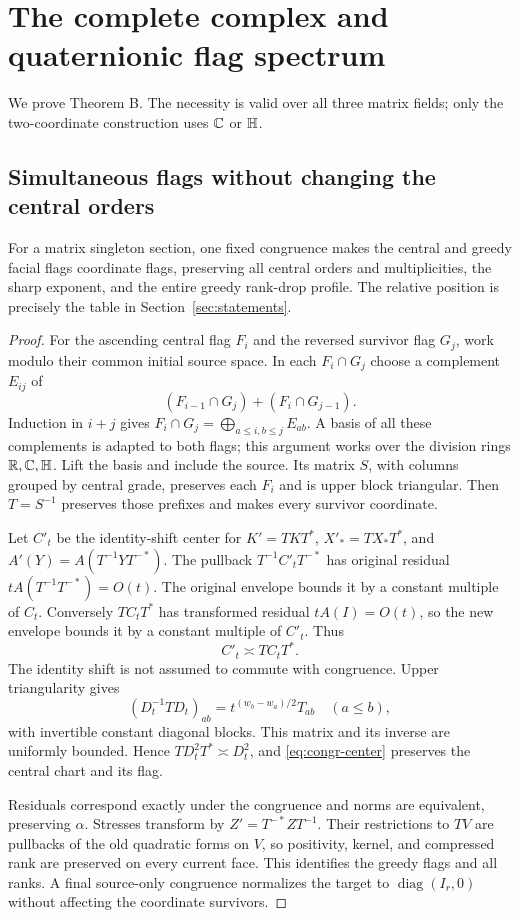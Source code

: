 \section{The complete complex and quaternionic flag spectrum}\label{sec:fine}
We prove Theorem B. The necessity is valid over all three matrix fields; only the two-coordinate construction uses $\mathbb C$ or $\mathbb H$.

\subsection{Simultaneous flags without changing the central orders}
\begin{lemma}\label{lem:flags}
For a matrix singleton section, one fixed congruence makes the central and greedy facial flags coordinate flags, preserving all central orders and multiplicities, the sharp exponent, and the entire greedy rank-drop profile. The relative position is precisely the table in Section~\ref{sec:statements}.
\end{lemma}
\begin{proof}
For the ascending central flag $F_i$ and the reversed survivor flag $G_j$, work modulo their common initial source space. In each $F_i\cap G_j$ choose a complement $E_{ij}$ of
\[
 (F_{i-1}\cap G_j)+(F_i\cap G_{j-1}).
\]
Induction in $i+j$ gives $F_i\cap G_j=\bigoplus_{a\le i,b\le j}E_{ab}$. A basis of all these complements is adapted to both flags; this argument works over the division rings $\mathbb R,\mathbb C,\mathbb H$. Lift the basis and include the source. Its matrix $S$, with columns grouped by central grade, preserves each $F_i$ and is upper block triangular. Then $T=S^{-1}$ preserves those prefixes and makes every survivor coordinate.

Let $C'_t$ be the identity-shift center for $K'=TKT^*$, $X'_* = TX_*T^*$, and $A'(Y)=A(T^{-1}YT^{-*})$. The pullback $T^{-1}C'_tT^{-*}$ has original residual $tA(T^{-1}T^{-*})=O(t)$. The original envelope bounds it by a constant multiple of $C_t$. Conversely $TC_tT^*$ has transformed residual $tA(I)=O(t)$, so the new envelope bounds it by a constant multiple of $C'_t$. Thus
\begin{equation}\label{eq:congr-center}
 C'_t\asymp TC_tT^*.
\end{equation}
The identity shift is not assumed to commute with congruence. Upper triangularity gives
\[
 (D_t^{-1}TD_t)_{ab}=t^{(w_b-w_a)/2}T_{ab}\quad(a\le b),
\]
with invertible constant diagonal blocks. This matrix and its inverse are uniformly bounded. Hence $TD_t^2T^*\asymp D_t^2$, and \eqref{eq:congr-center} preserves the central chart and its flag.

Residuals correspond exactly under the congruence and norms are equivalent, preserving $\alpha$. Stresses transform by $Z'=T^{-*}ZT^{-1}$. Their restrictions to $TV$ are pullbacks of the old quadratic forms on $V$, so positivity, kernel, and compressed rank are preserved on every current face. This identifies the greedy flags and all ranks. A final source-only congruence normalizes the target to $\operatorname{diag}(I_r,0)$ without affecting the coordinate survivors.
\end{proof}

